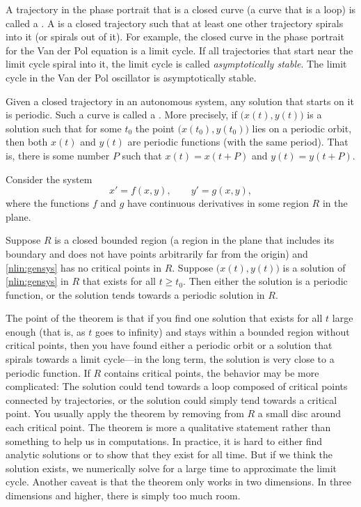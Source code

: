 A trajectory in the phase portrait that is a closed 
curve (a curve that is a loop) is called a 
\emph{}.
A \emph{}
is a closed trajectory such
that at least one other trajectory spirals into it (or spirals out of it).
For example, the closed curve in the phase portrait for the Van der Pol
equation is a limit cycle.
If all trajectories that start near the limit cycle spiral into it, the
limit cycle is called
\emph{asymptotically stable}.
The limit cycle in the Van der Pol oscillator is 
asymptotically stable.

Given a closed trajectory in an autonomous system,
any solution that starts on it is periodic.
Such a curve is called a
\emph{}.
More precisely, if
$\bigl(x(t),y(t)\bigr)$
is a solution such that for some $t_0$ the point
$\bigl(x(t_0),y(t_0)\bigr)$ lies on a periodic orbit, then both $x(t)$ and $y(t)$
are periodic functions (with the same period).  That is, there is some
number $P$ such that $x(t) = x(t+P)$ and $y(t) = y(t+P)$.

Consider the system
\begin{equation} \label{nlin:gensys}
x' = f(x,y), \qquad y' = g(x,y) ,
\end{equation}
where the functions $f$ and $g$ have continuous derivatives in some region
$R$ in the plane.

\begin{theorem}%
Suppose $R$ is a closed bounded region (a region in the plane that includes
its boundary and does not have points arbitrarily far from the origin)
and \eqref{nlin:gensys} has no critical points in $R$.
Suppose $\bigl(x(t), y(t)\bigr)$ is a solution of
\eqref{nlin:gensys} in $R$ that exists
for all $t \geq t_0$.  Then either the solution is a periodic function,
or the solution tends towards a periodic solution in $R$.
\end{theorem}

The point of the theorem is that if you find one solution that exists
for all $t$ large enough (that is, as $t$ goes to infinity) and stays
within a bounded region without critical points, then
you have found either a periodic orbit or a solution that spirals towards a
limit cycle---in the long term, the
solution is very close to a periodic function.
If $R$ contains critical points, the behavior may be
more complicated:  The solution could tend towards a loop
composed of critical points connected by trajectories, or 
the solution could simply tend towards a critical point.
You usually apply the theorem by removing from $R$
a small disc around each critical point.
The theorem is more a qualitative statement rather than
something to help us in computations.  In practice, it is hard to either
find analytic solutions or to show that they exist for all time.
But if we think the solution exists, we numerically solve for a
large time to approximate the limit cycle.
Another caveat is that the theorem only works in two
dimensions.  In three dimensions and higher, there is simply too much room.

